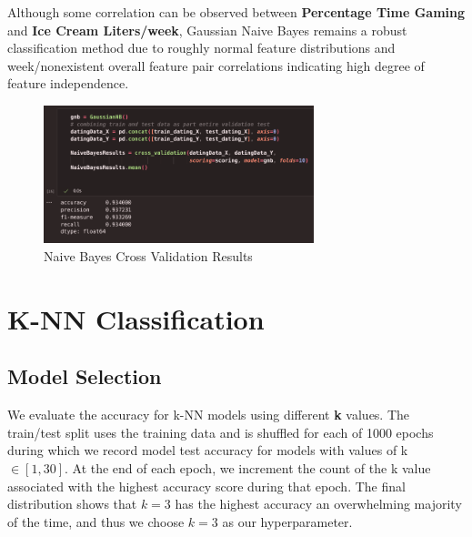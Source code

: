 \documentclass{article}
\begin{document}
    Although some correlation can be observed between \textbf{Percentage Time Gaming} and
    \textbf{Ice Cream Liters/week}, Gaussian Naive Bayes remains a robust classification method due to
    roughly normal feature distributions and week/nonexistent overall feature pair correlations indicating
    high degree of feature independence.

    \begin{figure}[H]
        \centering
        \includegraphics[width=0.7\textwidth, height=0.25\textheight]{NB_results.png}
        \caption{\small{Naive Bayes Cross Validation Results}}
    \end{figure}

\section*{K-NN Classification}

    \subsection*{Model Selection}

    We evaluate the accuracy for k-NN models using different \textbf{k} values. The train/test
    split uses the training data and is shuffled for each of 1000 epochs during which we record model test accuracy
    for models with values of k $\in [1,30]$. At the end of each epoch, we
    increment the count of the k value associated with the highest accuracy score during
    that epoch. The final distribution shows that $k=3$ has the highest accuracy an overwhelming
    majority of the time, and thus we choose $k=3$ as our hyperparameter.
    
\end{document}
